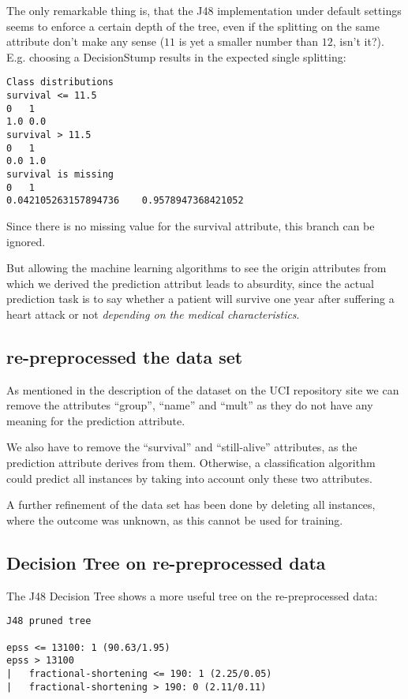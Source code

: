 \documentclass[paper=a4, fontsize=11pt]{scrartcl} %
\numberwithin{equation}{section} %
\numberwithin{figure}{section} %
\numberwithin{table}{section} %
\begin{document}
The only remarkable thing is, that the J48 implementation under default settings seems to enforce a certain depth of the tree, even if the splitting on the same attribute don't make any sense ($ 11 $ is yet a smaller number than $ 12 $, isn't it?). E.g. choosing a DecisionStump results in the expected single splitting: 
\begin{lstlisting}
Class distributions
survival <= 11.5
0   1   
1.0 0.0 
survival > 11.5
0   1   
0.0 1.0 
survival is missing
0   1   
0.042105263157894736    0.9578947368421052
\end{lstlisting}
Since there is no missing value for the survival attribute, this branch can be ignored.

But allowing the machine learning algorithms to see the origin attributes from which we derived the prediction attribut leads to absurdity, since the actual prediction task is to say whether a patient will survive one year after suffering a heart attack or not \emph{depending on the medical characteristics}.


\subsection{re-preprocessed the data set}

As mentioned in the description of the dataset on the UCI repository site we can remove the attributes ``group'', ``name'' and ``mult'' as they do not have any meaning for the prediction attribute.

We also have to remove the ``survival'' and ``still-alive'' attributes, as the prediction attribute derives from them. Otherwise, a classification algorithm could predict all instances by taking into account only these two attributes.

A further refinement of the data set has been done by deleting all instances, where the outcome was unknown, as this cannot be used for training.

\subsection{Decision Tree on re-preprocessed data}

The J48 Decision Tree shows a more useful tree on the re-preprocessed data:
\begin{lstlisting}
J48 pruned tree

epss <= 13100: 1 (90.63/1.95)
epss > 13100
|   fractional-shortening <= 190: 1 (2.25/0.05)
|   fractional-shortening > 190: 0 (2.11/0.11)
\end{lstlisting}
\end{document}
